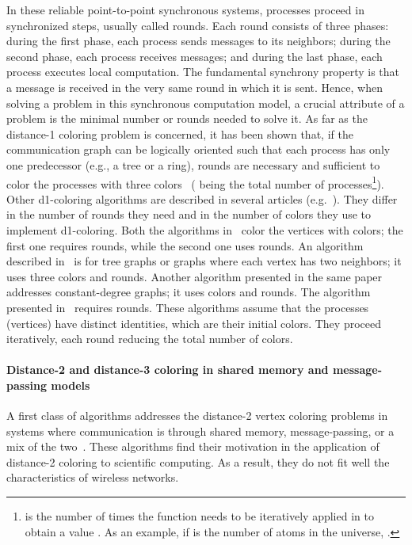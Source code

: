 \documentclass[11pt,english]{article}
\begin{document}
In these reliable point-to-point synchronous systems, processes
proceed in synchronized steps, usually called rounds. Each round
consists of three phases: during the first phase, each process sends
messages to its neighbors; during the second phase, each process
receives messages; and during the last phase, each process executes
local computation.  The fundamental synchrony property is that a
message is received in the very same round in which it is sent. Hence,
when solving a problem in this synchronous computation model, a
crucial attribute of a problem is the minimal number or rounds needed
to solve it.  As far as the distance-1 coloring problem is concerned,
it has been shown that, if the communication graph can be logically
oriented such that each process has only one predecessor (e.g., a tree
or a ring),  rounds are necessary and sufficient to color
the processes with three colors~\cite{CV86,L92} ( being the total
number of processes\footnote{ is the number of times the
  function  needs to be iteratively applied in  to obtain a value .  As an example, if 
  is the number of atoms in the universe, .}).
Other d1-coloring algorithms are described in several articles
(e.g.~\cite{BE11,BEK14,GPS88,KW06}).  They differ in the number of
rounds they need and in the number of colors they use to implement
d1-coloring. Both the algorithms in~\cite{BE11,BEK14} color the
vertices with  colors; the first one requires
 rounds, while the second one uses  rounds.  An algorithm described in~\cite{GPS88} is for tree
graphs or graphs where each vertex has two neighbors; it uses three
colors and  rounds. Another algorithm presented in the
same paper addresses constant-degree graphs; it uses 
colors and  rounds. The algorithm presented
in~\cite{KW06} requires  rounds.
These algorithms assume that the processes (vertices) have distinct
identities, which are their initial colors. They proceed iteratively,
each round reducing the total number of colors.

\paragraph{Distance-2 and distance-3 coloring in shared memory and
  message-passing  models}
A first class of algorithms addresses the distance-2 vertex coloring
problems in systems where communication is through shared memory,
message-passing, or a mix of the
two~\cite{BCGMBO05,BGMBC08,GMP02}. These algorithms find their
motivation in the application of distance-2 coloring to scientific
computing. As a result, they do not fit well the characteristics of
wireless networks.
\end{document}
